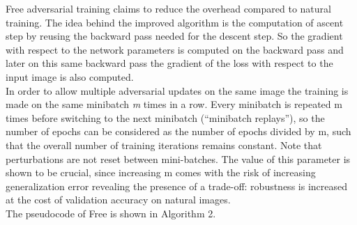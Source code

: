 \documentclass{article}
\begin{document}
Free adversarial training \cite{ShafahiEtAl2019b} claims to reduce the overhead
compared to natural training. The idea behind the improved algorithm is the
computation of ascent step by reusing the backward pass needed for the descent
step. So the gradient with respect to the network parameters is computed on the
backward pass and later on this same backward pass the gradient of the loss with
respect to the input image is also computed.\\
In order to allow multiple adversarial updates on the same image the training is
made on the same minibatch \textit{m} times in a row. Every minibatch is
repeated m times before switching to the next minibatch (“minibatch replays”),
so the number of epochs can be considered as the number of epochs divided by m,
such that the overall number of training iterations remains constant. Note that
perturbations are not reset between mini-batches. The value of this parameter is
shown to be crucial, since increasing m comes with the risk of increasing
generalization error revealing  the presence of a trade-off: robustness is
increased at the cost of validation accuracy on natural images.\\
The pseudocode of Free is shown in Algorithm 2.
\end{document}
